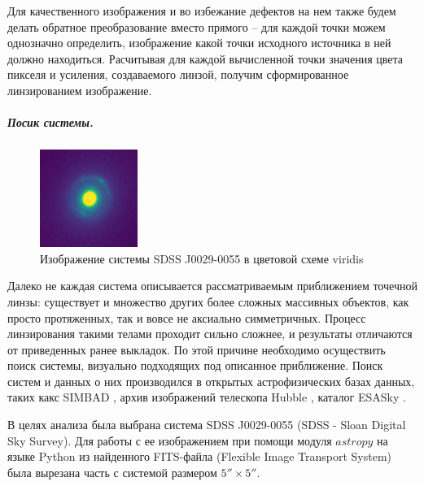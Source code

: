 \documentclass[12pt,a4paper]{article}
\begin{document}
Для качественного изображения и во избежание дефектов на нем также будем делать обратное преобразование вместо прямого -- для каждой точки можем однозначно определить, изображение какой точки исходного источника в ней должно находиться. 
Расчитывая для каждой вычисленной точки значения цвета пикселя и усиления, создаваемого линзой, получим сформированное линзированием изображение.

\subparagraph*{Посик системы.} 
\begin{figure}
    \centering
    \includegraphics[width=0.7\linewidth]{sources/sdssj0029-0055.png}
    \caption{\small Изображение системы SDSS J0029-0055 в цветовой схеме viridis}
\end{figure}
Далеко не каждая система описывается рассматриваемым приближением точечной линзы: существует и множество других более сложных массивных объектов, как просто протяженных, так и вовсе не аксиально симметричных.
Процесс линзирования такими телами проходит сильно сложнее, и результаты отличаются от приведенных ранее выкладок.
По этой причине необходимо осуществить поиск системы, визуально подходящих под описанное приближение. 
Поиск систем и данных о них производился в открытых астрофизических базах данных, таких какс SIMBAD \cite{simbad}, архив изображений телескопа Hubble \cite{hubble}, каталог ESASky \cite{esasky}.

В целях анализа была выбрана система SDSS J0029-0055 (SDSS - Sloan Digital Sky Survey).
Для работы с ее изображением при помощи модуля $astropy$ на языке Python из найденного FITS-файла (Flexible Image Transport System) была вырезана часть с системой размером  $5'' \times 5''$.
\end{document}
